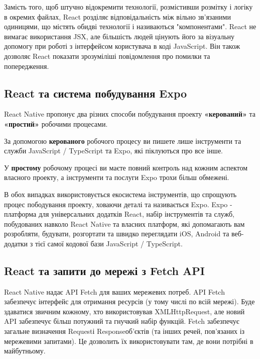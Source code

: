 Замість того, щоб штучно відокремити технології, розмістивши розмітку і логіку в окремих файлах, React розділяє відповідальність між вільно зв’язаними одиницями, що містять обидві технології і називаються "компонентами".
React не вимагає використання JSX, але більшість людей цінують його за візуальну допомогу при роботі з інтерфейсом користувача в коді JavaScript.
Він також дозволяє React показати зрозуміліші повідомлення про помилки та попередження.

\subsection{React та система побудування Expo}
\label{subsec:rn_expo}
React Native пропонує два різних способи побудування проекту \textbf{«керований»} та \textbf{«простий»} робочими процесами.
\begin{itemize}
    \begin{item}
        За допомогою \textbf{керованого} робочого процесу ви пишете лише інструменти та служби JavaScript / TypeScript та Expo, які піклуються про все інше.
    \end{item}
    \begin{item}
        У \textbf{простому} робочому процесі ви маєте повний контроль над кожним аспектом власного проекту, а інструменти та послуги Expo трохи більш обмежені.
    \end{item}
\end{itemize}

В обох випадках використовується екосистема інструментів, що спрощують процес пободування проекту, ховаючи деталі та називається Expo.
Expo - платформа для універсальних додатків React, набір інструментів та служб, побудованих навколо React Native та власних платформ, які допомагають вам розробляти, будувати, розгортати та швидко переглядати iOS, Android та веб-додатки з тієї самої кодової бази JavaScript / TypeScript.\cite{expo_doc}

\subsection{React та запити до мережі з Fetch API}
\label{subsec:rn_fetch_api}
React Native надає API Fetch для ваших мережевих потреб.
API Fetch забезпечує інтерфейс для отримання ресурсів (у тому числі по всій мережі).
Буде здаватися звичним кожному, хто використовував XMLHttpRequest, але новий API забезпечує більш потужний та гнучкий набір функцій.
Fetch забезпечує загальне визначення Requestі Responseоб'єктів (та інших речей, пов'язаних із мережевими запитами).
Це дозволить їх використовувати там, де вони потрібні в майбутньому.

